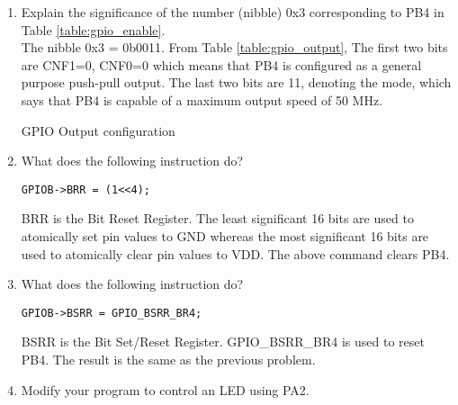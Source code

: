 \begin{enumerate}[label=\arabic*.,ref=\theenumi]
\begin{table}[!ht]
\centering
\small

\caption{GPIO Enable pins}
\label{table:gpio_enable}
\end{table}
\item Explain the significance of the number (nibble) 0x3 corresponding to PB4 in Table \ref{table:gpio_enable}.
\\
\solution The nibble 0x3 = 0b0011.  From Table \ref{table:gpio_output},   The first two bits are CNF1=0, CNF0=0 which
means that PB4 is configured as a general purpose push-pull output. The last two bits are 11, denoting the mode, which
says that PB4 is  capable of a maximum output speed of 50 MHz.   
\begin{table}[!ht]
\centering
\small

\caption{GPIO Output configuration}
\label{table:gpio_output}
\end{table}
\item What does the following instruction do?
\begin{lstlisting}
GPIOB->BRR = (1<<4);
\end{lstlisting}
\solution BRR is the Bit Reset Register.  The least significant 16 bits are used to atomically set pin values to GND whereas the most significant 16 bits are used to atomically clear pin values to VDD. The above command clears PB4. 
\\ 
\item What does the following instruction do?
\begin{lstlisting}
GPIOB->BSRR = GPIO_BSRR_BR4;
\end{lstlisting}
\solution BSRR is the Bit Set/Reset Register.  GPIO\_BSRR\_BR4 is used to reset PB4.  The result is the same as the previous problem.
\item Modify your program to control an LED using PA2.

\end{enumerate}

